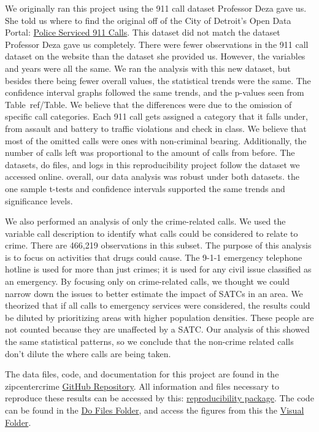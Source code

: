 \documentclass[12pt]{article}
\begin{document}

We originally ran this project using the 911 call dataset Professor Deza gave us. She told us where to find the original off of the City of Detroit's Open Data Portal: \href{https://data.detroitmi.gov/datasets/detroitmi::police-serviced-911-calls/about}{Police Serviced 911 Calls}. This dataset did not match the dataset Professor Deza gave us completely. There were fewer observations in the 911 call dataset on the website than the dataset she provided us. However, the variables and years were all the same. We ran the analysis with this new dataset, but besides there being fewer overall values, the statistical trends were the same. The confidence interval graphs followed the same trends, and the p-values seen from Table~ref/{Table}. We believe that the differences were due to the omission of specific call categories. Each 911 call gets assigned a category that it falls under, from assault and battery to traffic violations and check in class. We believe that most of the omitted calls were ones with non-criminal bearing. Additionally, the number of calls left was proportional to the amount of calls from before. The datasets, do files, and logs in this reproducibility project follow the dataset we accessed online. overall, our data analysis was robust under both datasets. the one sample t-tests and confidence intervals supported the same trends and significance levels. 

We also performed an analysis of only the crime-related calls. We used the variable call description to identify what calls could be considered to relate to crime. There are 466,219 observations in this subset. The purpose of this analysis is to focus on activities that drugs could cause. The 9-1-1 emergency telephone hotline is used for more than just crimes; it is used for any civil issue classified as an emergency. By focusing only on crime-related calls, we thought we could narrow down the issues to better estimate the impact of SATCs in an area. We theorized that if all calls to emergency services were considered, the results could be diluted by prioritizing areas with higher population densities. These people are not counted because they are unaffected by a SATC. Our analysis of this showed the same statistical patterns, so we conclude that the non-crime related calls don't dilute the where calls are being taken. 

The data files, code, and documentation for this project are found in the zipcentercrime \href{https://github.com/ecn310/course-project-zipcentercrime}{GitHub Repository}. All information and files necessary to reproduce these results can be accessed by this: \href{https://github.com/ecn310/course-project-zipcentercrime/tree/main/Reproducibility%20Package}{reproducibility package}. The code can be found in the \href{https://github.com/ecn310/course-project-zipcentercrime/tree/main/Reproducibility%20Package/Do%20files}{Do Files Folder}, and access the figures from this the \href{https://github.com/ecn310/course-project-zipcentercrime/tree/main/Reproducibility%20Package/Visual%20Graphics}{Visual Folder}. 
\end{document}
